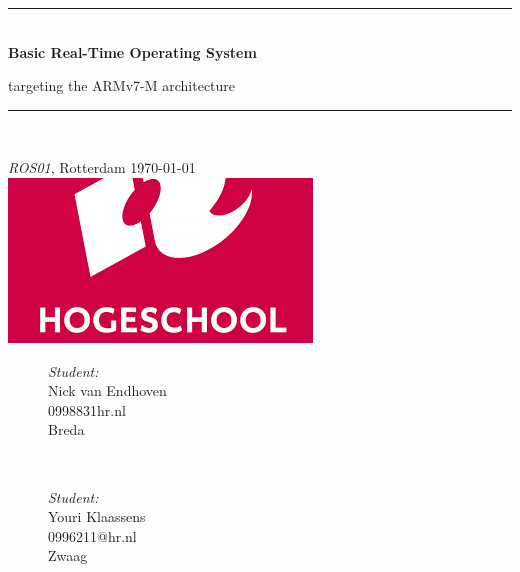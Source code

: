 \begin{titlepage}
	\centering
	\smallbreak                         %
	\rule{\linewidth}{0.2 mm} \\[0.4 cm]
	{\huge \bfseries Basic Real-Time Operating System}\\
	\smallbreak
	\par{\large targeting the ARMv7-M architecture}      
	\rule{\linewidth}{0.2 mm} \\[1.5 cm]
	\vspace*{0.5 cm}
	\par{\LARGE \textit{ROS01}, Rotterdam \today }\\[1.0 cm]
    \includegraphics[scale=0.99]{img/HR.png}\\[1.0 cm]	

	


\begin{figure}[!b]
	\begin{minipage}{0.5\textwidth}
		\begin{flushleft} \large
			\emph{Student:}\\
		    Nick van Endhoven\\
            0998831hr.nl\\
            Breda\\
			\end{flushleft}
			\end{minipage}~
			\begin{minipage}{0.5\textwidth}
 
		\begin{flushright} \large
            \emph{Student:}\\
			Youri Klaassens\\
            0996211@hr.nl\\
            Zwaag\\
		\end{flushright}
        
	\end{minipage}\\[2 cm]
\end{figure}
    
    
    
    
	
\end{titlepage}
